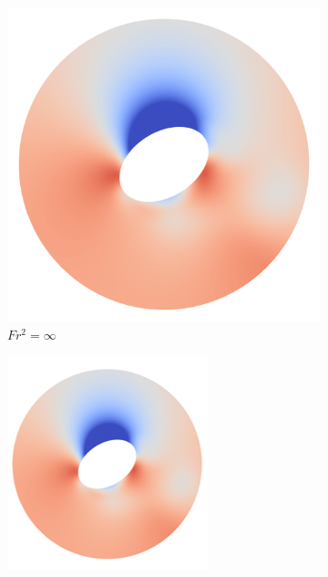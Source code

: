 \begin{figure}
    \centering
    \begin{subfigure}[b]{0.25\textwidth}
        \centering
        \includegraphics[width=\textwidth]{images/spinning_ellipse/par1p5fsinf.png}
        \caption{$Fr^2 = \infty$}
        \label{fig:par1p5fsinf}
    \end{subfigure}
    \hfill
    \begin{subfigure}[b]{0.25\textwidth}
        \centering
        \includegraphics[width=\textwidth]{images/spinning_ellipse/par1p5fs100.png}

\end{subfigure}
\end{figure}
